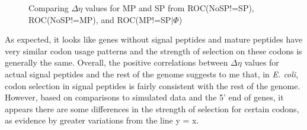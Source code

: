 \documentclass[11pt]{labbook}
\begin{document}
\begin{figure}
\begin{subfigure}{0.55\textwidth}
\end{subfigure}
\caption{Comparing $\Delta\eta$ values for MP and SP from ROC(NoSP!=SP), ROC(NoSP!=MP), and ROC(MP!=SP$|\Phi$)}
\end{figure}
\newpage

As expected, it looks like genes without signal peptides and mature peptides have very similar codon usage patterns and the strength of selection on these codons is generally the same. Overall, the positive correlations between $\Delta\eta$ values for actual signal peptides and the rest of the genome suggests to me that, in \textit{E. coli}, codon selection in signal peptides is fairly consistent with the rest of the genome. However, based on comparisons to simulated data and the 5' end of genes, it appears there are some differences in the strength of selection for certain codons, as evidence by greater variations from the line y = x.
\end{document}
